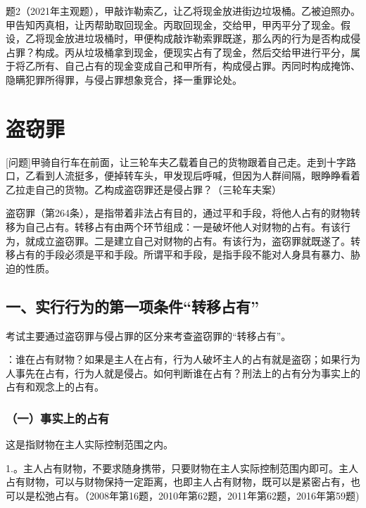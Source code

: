 题2（2021年主观题），甲敲诈勒索乙，让乙将现金放进街边垃圾桶。乙被迫照办。甲告知丙真相，让丙帮助取回现金。丙取回现金，交给甲，甲丙平分了现金。假设，乙将现金放进垃圾桶时，甲便构成敲诈勒索罪既遂，那么丙的行为是否构成侵占罪？构成。丙从垃圾桶拿到现金，便现实占有了现金，然后交给甲进行平分，属于将乙所有、自己占有的现金变成自己和甲所有，构成侵占罪。丙同时构成掩饰、隐瞒犯罪所得罪，与侵占罪想象竞合，择一重罪论处。

\section{盗窃罪}

[问题]甲骑自行车在前面，让三轮车夫乙载着自己的货物跟着自己走。走到十字路口，乙看到人流挺多，便掉转车头，甲发现后呼喊，但因为人群间隔，眼睁睁看着乙拉走自己的货物。乙构成盗窃罪还是侵占罪？（三轮车夫案）

盗窃罪（第264条），是指带着非法占有目的，通过平和手段，将他人占有的财物转移为自己占有。转移占有由两个环节组成：一是破坏他人对财物的占有。有该行为，就成立盗窃罪。二是建立自己对财物的占有。有该行为，盗窃罪就既遂了。转移占有的手段必须是平和手段。所谓平和手段，是指手段不能对人身具有暴力、胁迫的性质。


\subsection*{一、实行行为的第一项条件“转移占有”}

考试主要通过盗窃罪与侵占罪的区分来考查盗窃罪的“转移占有”。


：谁在占有财物？如果是主人在占有，行为人破坏主人的占有就是盗窃；如果行为人事先在占有，行为人就是侵占。如何判断谁在占有？刑法上的占有分为事实上的占有和观念上的占有。

\subsubsection*{（一）事实上的占有}

这是指财物在主人实际控制范围之内。

1.。主人占有财物，不要求随身携带，只要财物在主人实际控制范围内即可。主人占有财物，可以与财物保持一定距离，也即主人占有财物，既可以是紧密占有，也可以是松弛占有。（2008年第16题，2010年第62题，2011年第62题，2016年第59题)


